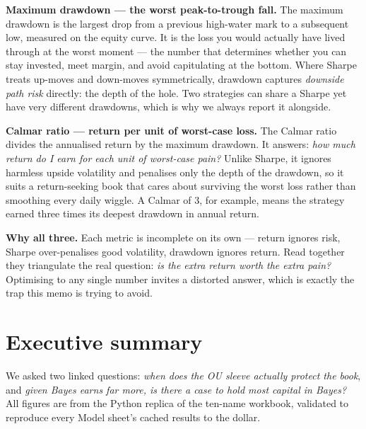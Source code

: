 \documentclass[11pt]{article}
\begin{document}
\textbf{Maximum drawdown --- the worst peak-to-trough fall.} The maximum drawdown is the
largest drop from a previous high-water mark to a subsequent low, measured on the equity
curve. It is the loss you would actually have lived through at the worst moment --- the number
that determines whether you can stay invested, meet margin, and avoid capitulating at the
bottom. Where Sharpe treats up-moves and down-moves symmetrically, drawdown captures
\emph{downside path risk} directly: the depth of the hole. Two strategies can share a Sharpe
yet have very different drawdowns, which is why we always report it alongside.

\textbf{Calmar ratio --- return per unit of worst-case loss.} The Calmar ratio divides the
annualised return by the maximum drawdown. It answers: \emph{how much return do I earn for
each unit of worst-case pain?} Unlike Sharpe, it ignores harmless upside volatility and
penalises only the depth of the drawdown, so it suits a return-seeking book that cares about
surviving the worst loss rather than smoothing every daily wiggle. A Calmar of 3, for example,
means the strategy earned three times its deepest drawdown in annual return.

\textbf{Why all three.} Each metric is incomplete on its own --- return ignores risk, Sharpe
over-penalises good volatility, drawdown ignores return. Read together they triangulate the
real question: \emph{is the extra return worth the extra pain?} Optimising to any single number
invites a distorted answer, which is exactly the trap this memo is trying to avoid.

\section{Executive summary}

We asked two linked questions: \emph{when does the OU sleeve actually protect the book}, and
\emph{given Bayes earns far more, is there a case to hold most capital in Bayes?} All figures
are from the Python replica of the ten-name workbook, validated to reproduce every Model
sheet's cached results to the dollar.
\end{document}
